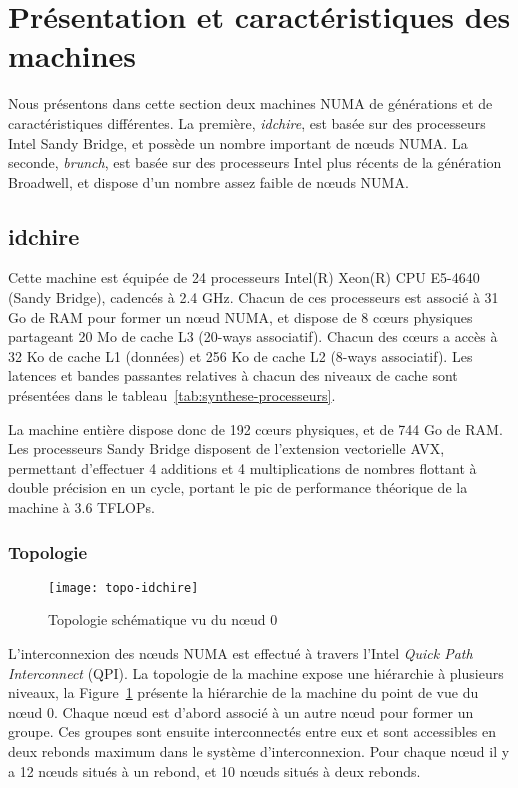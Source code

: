 \section{Présentation et caractéristiques des machines}\label{sec:contribs:machines}

Nous présentons dans cette section deux machines NUMA de générations et de caractéristiques différentes.
La première, \emph{idchire}, est basée sur des processeurs Intel Sandy Bridge, et possède un nombre important de nœuds NUMA.
La seconde, \emph{brunch}, est basée sur des processeurs Intel plus récents de la génération Broadwell, et dispose d'un nombre assez faible de nœuds NUMA.

\subsection{idchire}\label{sec:contribs:machines:idchire}


Cette machine est équipée de 24 processeurs Intel(R) Xeon(R) CPU E5-4640 (Sandy Bridge), cadencés à 2.4 GHz.
Chacun de ces processeurs est associé à 31 Go de RAM pour former un nœud NUMA, et dispose de 8 cœurs physiques partageant 20 Mo de cache L3 (20-ways associatif).
Chacun des cœurs a accès à 32 Ko de cache L1 (données) et 256 Ko de cache L2 (8-ways associatif).
Les latences et bandes passantes relatives à chacun des niveaux de cache sont présentées dans le tableau~\ref{tab:synthese-processeurs}.

La machine entière dispose donc de 192 cœurs physiques, et de 744 Go de RAM.
Les processeurs Sandy Bridge disposent de l'extension vectorielle AVX, permettant d'effectuer 4 additions et 4 multiplications de nombres flottant à double précision en un cycle, portant le pic de performance théorique de la machine à 3.6 TFLOPs.

\subsubsection{Topologie}

\begin{figure}[ht]
  \centering
  \texttt{[image: topo-idchire]}
  \caption{Topologie schématique vu du nœud 0}\label{fig:contribs:machines:idchire:topo-liens}
\end{figure}

L'interconnexion des nœuds NUMA est effectué à travers l'Intel \emph{Quick Path Interconnect} (QPI).
La topologie de la machine expose une hiérarchie à plusieurs niveaux, la Figure~\ref{fig:contribs:machines:idchire:topo-liens} présente la hiérarchie de la machine du point de vue du nœud 0.
Chaque nœud est d'abord associé à un autre nœud pour former un groupe. Ces groupes sont ensuite interconnectés entre eux et sont accessibles en deux rebonds maximum dans le système d'interconnexion.
Pour chaque nœud il y a 12 nœuds situés à un rebond, et 10 nœuds situés à deux rebonds.

